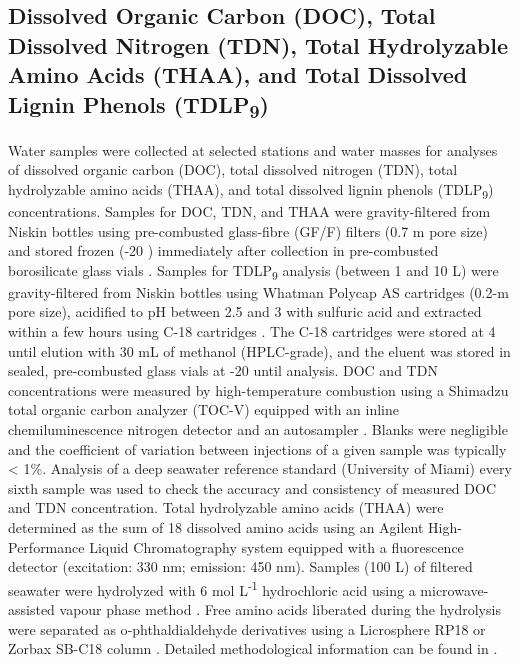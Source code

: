 \documentclass[essd, manuscript]{copernicus}
\begin{document}
\subsection{Dissolved Organic Carbon (DOC), Total Dissolved Nitrogen (TDN), Total Hydrolyzable Amino Acids (THAA), and Total Dissolved Lignin Phenols (TDLP\textsubscript{9})}

Water samples were collected at selected stations and water masses for analyses of dissolved organic carbon (DOC), total dissolved nitrogen (TDN), total hydrolyzable amino acids (THAA), and total dissolved lignin phenols (TDLP\textsubscript{9}) concentrations. Samples for DOC, TDN, and THAA were gravity-filtered from Niskin bottles using pre-combusted glass-fibre (GF/F) filters (0.7 \textmu m pore size) and stored frozen (-20 \textcelsius{}) immediately after collection in pre-combusted borosilicate glass vials \citep{Shen2012}. Samples for TDLP\textsubscript{9} analysis (between 1 and 10 L) were gravity-filtered from Niskin bottles using Whatman Polycap AS cartridges (0.2-\textmu m pore size), acidified to pH between 2.5 and 3 with sulfuric acid and extracted within a few hours using C-18 cartridges \citep{Louchouarn2000, Fichot2013}. The C-18 cartridges were stored at 4 \textcelsius{} until elution with 30 mL of methanol (HPLC-grade), and the eluent was stored in sealed, pre-combusted glass vials at -20 \textcelsius{} until analysis. DOC and TDN concentrations were measured by high-temperature combustion using a Shimadzu total organic carbon analyzer (TOC-V) equipped with an inline chemiluminescence nitrogen detector and an autosampler \citep{Benner1993}. Blanks were negligible and the coefficient of variation between injections of a given sample was typically < 1\%. Analysis of a deep seawater reference standard (University of Miami) every sixth sample was used to check the accuracy and consistency of measured DOC and TDN concentration. Total hydrolyzable amino acids (THAA) were determined as the sum of 18 dissolved amino acids using an Agilent High-Performance Liquid Chromatography system equipped with a fluorescence detector (excitation: 330 nm; emission: 450 nm). Samples (100 \textmu L) of filtered seawater were hydrolyzed with 6 mol L\textsuperscript{-1} hydrochloric acid using a microwave-assisted vapour phase method \citep{Kaiser2005}. Free amino acids liberated during the hydrolysis were separated as o‑phthaldialdehyde derivatives using a Licrosphere RP18 or Zorbax SB-C18 column \citep{Shen2012}. Detailed methodological information can be found in \citet{Fichot2013}.
\end{document}
